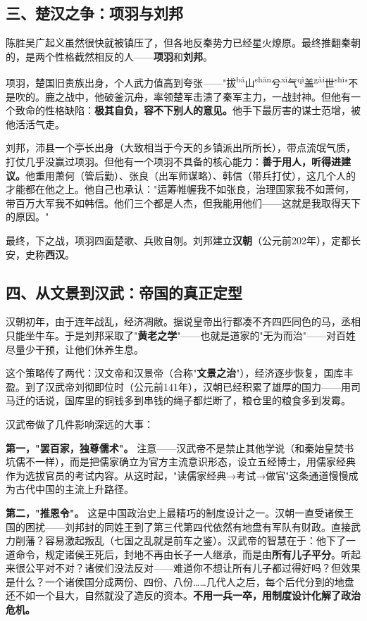 \documentclass[a4paper,12pt]{ctexart}
\newcommand{\ruby}[2]{#1\textsuperscript{#2}}
\begin{document}
\subsection*{三、楚汉之争：项羽与刘邦}

陈胜吴广起义虽然很快就被镇压了，但各地反秦势力已经星火燎原。最终推翻秦朝的，是两个性格截然相反的人——\textbf{项羽}和\textbf{刘邦}。

项羽，楚国旧贵族出身，个人武力值高到夸张——"\ruby{拔}{bá}\ruby{山}{shān}\ruby{兮}{xī}\ruby{气}{qì}\ruby{盖}{gài}\ruby{世}{shì}"不是吹的。鹿之战中，他破釜沉舟，率领楚军击溃了秦军主力，一战封神。但他有一个致命的性格缺陷：\textbf{极其自负，容不下别人的意见。}他手下最厉害的谋士范增，被他活活气走。

刘邦，沛县一个亭长出身（大致相当于今天的乡镇派出所所长），带点流氓气质，打仗几乎没赢过项羽。但他有一个项羽不具备的核心能力：\textbf{善于用人，听得进建议。}他重用萧何（管后勤）、张良（出军师谋略）、韩信（带兵打仗），这几个人的才能都在他之上。他自己也承认："运筹帷幄我不如张良，治理国家我不如萧何，带百万大军我不如韩信。他们三个都是人杰，但我能用他们——这就是我取得天下的原因。"

最终，下之战，项羽四面楚歌、兵败自刎。刘邦建立\textbf{汉朝}（公元前202年），定都长安，史称\textbf{西汉}。

\subsection*{四、从文景到汉武：帝国的真正定型}

汉朝初年，由于连年战乱，经济凋敝。据说皇帝出行都凑不齐四匹同色的马，丞相只能坐牛车。于是刘邦采取了"\textbf{黄老之学}"——也就是道家的"无为而治"——对百姓尽量少干预，让他们休养生息。

这个策略传了两代：汉文帝和汉景帝（合称"\textbf{文景之治}"），经济逐步恢复，国库丰盈。到了汉武帝刘彻即位时（公元前141年），汉朝已经积累了雄厚的国力——用司马迁的话说，国库里的铜钱多到串钱的绳子都烂断了，粮仓里的粮食多到发霉。

汉武帝做了几件影响深远的大事：

\textbf{第一，"罢百家，独尊儒术"。} 注意——汉武帝不是禁止其他学说（和秦始皇焚书坑儒不一样），而是把儒家确立为官方主流意识形态，设立五经博士，用儒家经典作为选拔官员的考试内容。从这时起，"读儒家经典→考试→做官"这条通道慢慢成为古代中国的主流上升路径。

\textbf{第二，"推恩令"。} 这是中国政治史上最精巧的制度设计之一。汉朝一直受诸侯王国的困扰——刘邦封的同姓王到了第三代第四代依然有地盘有军队有财政。直接武力削藩？容易激起叛乱（七国之乱就是前车之鉴）。汉武帝的智慧在于：他下了一道命令，规定诸侯王死后，封地不再由长子一人继承，而是由\textbf{所有儿子平分}。听起来很公平对不对？诸侯们没法反对——难道你不想让所有儿子都过得好吗？但效果是什么？一个诸侯国分成两份、四份、八份……几代人之后，每个后代分到的地盘还不如一个县大，自然就没了造反的资本。\textbf{不用一兵一卒，用制度设计化解了政治危机。}
\end{document}
